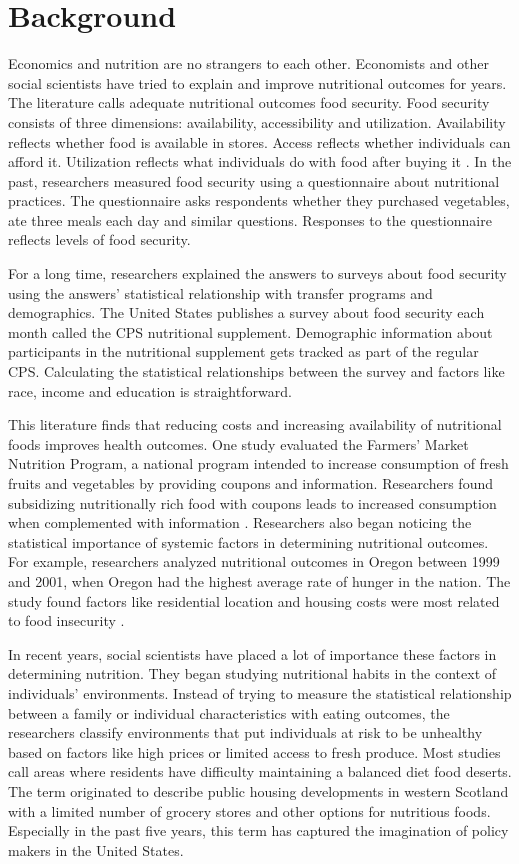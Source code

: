 \documentclass{report}
\begin{document}
\section{Background}

Economics and nutrition are no strangers to each other. Economists and other social scientists have tried to explain and improve nutritional outcomes for years. The literature calls adequate nutritional outcomes food security. Food security consists of three dimensions: availability, accessibility and utilization. Availability reflects whether food is available in stores. Access reflects whether individuals can afford it. Utilization reflects what individuals do with food after buying it \cite{barrett}. In the past, researchers measured food security using a questionnaire about nutritional practices. The questionnaire asks respondents whether they purchased vegetables, ate three meals each day and similar questions. Responses to the questionnaire reflects levels of food security.

For a long time, researchers explained the answers to surveys about food security using the answers' statistical relationship with transfer programs and demographics. The United States publishes a survey about food security each month called the CPS nutritional supplement. Demographic information about participants in the nutritional supplement gets tracked as part of the regular CPS. Calculating the statistical relationships between the survey and factors like race, income and education is straightforward.

This literature finds that reducing costs and increasing availability of nutritional foods improves health outcomes. One study evaluated the Farmers' Market Nutrition Program, a national program intended to increase consumption of fresh fruits and vegetables by providing coupons and information. Researchers found subsidizing nutritionally rich food with coupons leads to increased consumption when complemented with information \cite{Just}. Researchers also began noticing the statistical importance of systemic factors in determining nutritional outcomes. For example, researchers analyzed nutritional outcomes in Oregon between 1999 and 2001, when Oregon had the highest average rate of hunger in the nation. The study found factors like residential location and housing costs were most related to food insecurity \cite{Bernell}.

In recent years, social scientists have placed a lot of importance these factors in determining nutrition. They began studying nutritional habits in the context of individuals' environments. Instead of trying to measure the statistical relationship between a family or individual characteristics with eating outcomes, the researchers classify environments that put individuals at risk to be unhealthy based on factors like high prices or limited access to fresh produce. Most studies call areas where residents have difficulty maintaining a balanced diet food deserts. The term originated to describe public housing developments in western Scotland with a limited number of grocery stores and other options for nutritious foods. Especially in the past five years, this term has captured the imagination of policy makers in the United States.
\end{document}
